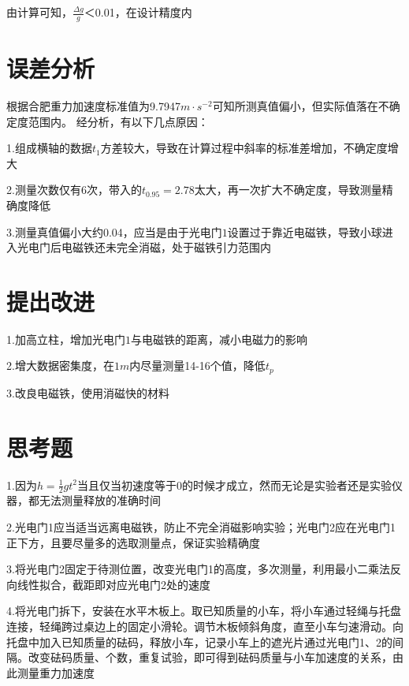 \documentclass[UTF8]{ctexart}
\begin{document}
    由计算可知，$\frac{\varDelta g}{g}$＜0.01，在设计精度内
    \section{误差分析}
    根据合肥重力加速度标准值为9.7947$m·s^{-2}$可知所测真值偏小，但实际值落在不确定度范围内。
    经分析，有以下几点原因：

    1.组成横轴的数据$t_1$方差较大，导致在计算过程中斜率的标准差增加，不确定度增大

    2.测量次数仅有6次，带入的$t_{0.95}=2.78$太大，再一次扩大不确定度，导致测量精确度降低

    3.测量真值偏小大约0.04，应当是由于光电门$1$设置过于靠近电磁铁，导致小球进入光电门后电磁铁还未完全消磁，处于磁铁引力范围内

    \section{提出改进}
    1.加高立柱，增加光电门$1$与电磁铁的距离，减小电磁力的影响

    2.增大数据密集度，在$1m$内尽量测量14-16个值，降低$t_p$

    3.改良电磁铁，使用消磁快的材料

    \section{思考题}
    1.因为$h=\frac{1}{2}gt^2$当且仅当初速度等于0的时候才成立，然而无论是实验者还是实验仪器，都无法测量释放的准确时间

    2.光电门1应当适当远离电磁铁，防止不完全消磁影响实验；光电门2应在光电门1正下方，且要尽量多的选取测量点，保证实验精确度

    3.将光电门2固定于待测位置，改变光电门1的高度，多次测量，利用最小二乘法反向线性拟合，截距即对应光电门2处的速度

    4.将光电门拆下，安装在水平木板上。取已知质量的小车，将小车通过轻绳与托盘连接，轻绳跨过桌边上的固定小滑轮。调节木板倾斜角度，直至小车匀速滑动。向托盘中加入已知质量的砝码，释放小车，记录小车上的遮光片通过光电门1、2的间隔。改变砝码质量、个数，重复试验，即可得到砝码质量与小车加速度的关系，由此测量重力加速度

    \nocite{jiaocheng}
    \nocite{shiyan}
    
    
\end{document}
